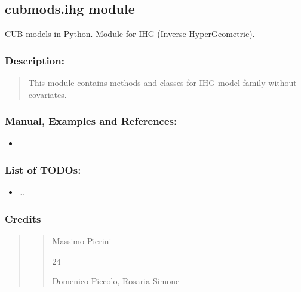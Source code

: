 \documentclass[letterpaper,10pt,english]{sphinxmanual}
\begin{document}
\subsection{cubmods.ihg module}
\label{\detokenize{cubmods:module-cubmods.ihg}}\label{\detokenize{cubmods:cubmods-ihg-module}}\label{\detokenize{cubmods:ihg0-module}}
\sphinxAtStartPar
CUB models in Python.
Module for IHG (Inverse HyperGeometric).


\subsubsection{Description:}
\label{\detokenize{cubmods:id77}}\begin{quote}

\sphinxAtStartPar
This module contains methods and classes
for IHG model family without covariates.
\end{quote}


\subsubsection{Manual, Examples and References:}
\label{\detokenize{cubmods:id78}}\begin{itemize}
\item {} 
\sphinxAtStartPar
{}

\end{itemize}


\subsubsection{List of TODOs:}
\label{\detokenize{cubmods:id79}}\begin{itemize}
\item {} 
\sphinxAtStartPar
…

\end{itemize}


\subsubsection{Credits}
\label{\detokenize{cubmods:id80}}\begin{quote}
\begin{quote}\begin{description}
\sphinxAtStartPar
Massimo Pierini

\sphinxhyphen{}24

\sphinxAtStartPar
Domenico Piccolo, Rosaria Simone

\sphinxAtStartPar
{}

\end{description}\end{quote}
\end{quote}
\end{document}
